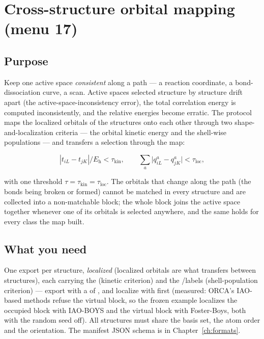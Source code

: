 \chapter{Cross-structure orbital mapping (menu 17)}
\label{ch:menu17}

\section{Purpose}

Keep one active space \emph{consistent} along a path --- a reaction coordinate,
a bond-dissociation curve, a scan.  Active spaces selected structure by
structure drift apart (the active-space-inconsistency error), the total
correlation energy is computed inconsistently, and the relative energies become
erratic.  The protocol maps the localized orbitals of the structures onto each
other through two shape-and-localization criteria --- the orbital kinetic energy
and the shell-wise populations --- and transfers a selection through the map:

\[
|t_{iL} - t_{jK}| / E_\mathrm{h} < \tau_{\mathrm{kin}},
\qquad
\sum_a \bigl| q^a_{iL} - q^a_{jK} \bigr| < \tau_{\mathrm{loc}},
\]

with one threshold $\tau = \tau_{\mathrm{kin}} = \tau_{\mathrm{loc}}$.  The
orbitals that change along the path (the bonds being broken or formed) cannot
be matched in every structure and are collected into a non-matchable block; the
whole block joins the active space together whenever one of its orbitals is
selected anywhere, and the same holds for every class the map built.

\section{What you need}

One  export per structure, \emph{localized} (localized
orbitals are what transfers between structures), each carrying the
 (kinetic criterion) and the /labels
(shell-population criterion) --- export with a
 of
, and
localize with  first (measured: ORCA's IAO-based methods refuse
the virtual block, so the frozen example localizes the occupied block with
IAO-BOYS and the virtual block with Foster-Boys, both with the random seed
off).  All structures must share the basis set, the atom order and the
orientation.  The manifest JSON schema is in Chapter~\ref{ch:formats}.

